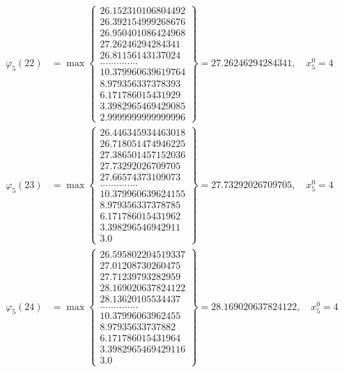 \documentclass{article}
\begin{document}
\begin{align*}
  
  
  
\varphi_{5}(22) &= \max \left\{ \begin{array}{c}
26.152310106804492 \\
 26.392154999268676 \\
 26.950401086424968 \\
 27.26246294284341 \\
 26.81156143137024 \\
 .............. \\
 10.379960639619764 \\
 8.979356337378393 \\
 6.171786015431929 \\
 3.3982965469429085 \\
 2.9999999999999996
\end{array} \right\} = 27.26246294284341, \quad x_{5}^0 = 4\\
  
  
  
  
\varphi_{5}(23) &= \max \left\{ \begin{array}{c}
26.446345934463018 \\
 26.718051474946225 \\
 27.386501457152036 \\
 27.73292026709705 \\
 27.66574373109073 \\
 .............. \\
 10.379960639624155 \\
 8.979356337378785 \\
 6.171786015431962 \\
 3.398296546942911 \\
 3.0
\end{array} \right\} = 27.73292026709705, \quad x_{5}^0 = 4\\
  
  
  
  
\varphi_{5}(24) &= \max \left\{ \begin{array}{c}
26.595802204519337 \\
 27.01208730260475 \\
 27.71239793282959 \\
 28.169020637824122 \\
 28.13620105534437 \\
 .............. \\
 10.37996063962455 \\
 8.97935633737882 \\
 6.171786015431964 \\
 3.3982965469429116 \\
 3.0
\end{array} \right\} = 28.169020637824122, \quad x_{5}^0 = 4\\
  

\end{align*}
\end{document}
